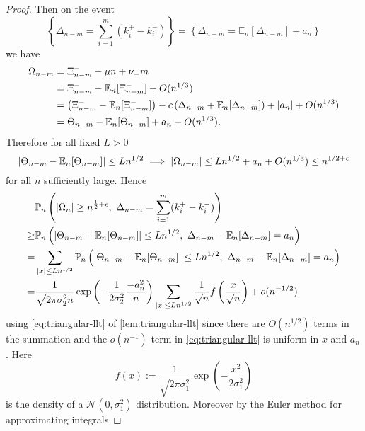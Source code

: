 \documentclass[draft]{scrartcl}
\newcommand{\E}{\mathbb E}
\newcommand{\calN}{\mathcal N}
\newcommand{\littleo}{o}
\newcommand{\bigo}{O}
\newcommand{\defeq}{:=}
\DeclarePairedDelimiter{\abs}{\lvert}{\rvert}
\begin{document}
\begin{proof}
    Then on the event 
    \begin{equation}
        \left\{ \Delta_{n-m} = \sum_{i=1}^m (k_i^+ - k_i^-) \right\} =
        \left\{ \Delta_{n-m} = \E_n[\Delta_{n-m}] + a_n \right\}
    \end{equation}
    we have
    \begin{align}
        \Omega_{n-m} &= \Xi^-_{n-m} - \mu n + \nu_- m \\
        &= \Xi^-_{n-m} - \E_n[\Xi^-_{n-m}] + \bigo(n^{1/3}) \\
        &= \left( \Xi^-_{n-m} - \E_n[\Xi^-_{n-m}] \right) - c \left( \Delta_{n-m} + \E_n[\Delta_{n-m}] \right) + \abs{a_n} + \bigo(n^{1/3}) \\
        &= \Theta_{n-m} - \E_n[\Theta_{n-m}] + a_n + \bigo(n^{1/3}).
    \end{align}
    Therefore for all fixed $L > 0$
    \begin{equation}
        \abs{\Theta_{n-m} - \E_n[\Theta_{n-m}]} \leq L n^{1/2} \implies \abs{\Omega_{n-m}} \leq Ln^{1/2} + a_n + \bigo(n^{1/3}) \leq n^{1/2 + \epsilon}
    \end{equation}
    for all $n$ sufficiently large. Hence
    \begin{align}
        &\mathbb P_n \left( \abs{\Omega_n} \geq n^{\frac{1}{2} + \epsilon},\ \Delta_{n-m} = \sum_{i=1}^m (k_i^+ - k_i^-) \right) \nonumber \\
        \geq& \mathbb P_n \left( \abs{\Theta_{n-m} - \E_n[\Theta_{n-m}]} \leq Ln^{1/2},\ \Delta_{n-m} - \E_n[\Delta_{n-m}] = a_n \right) \\
        =& \sum_{\abs{x} \leq Ln^{1/2}} \mathbb P_n \left( \abs{\Theta_{n-m} - \E_n[\Theta_{n-m}]} \leq Ln^{1/2},\ \Delta_{n-m} - \E_n[\Delta_{n-m}] = a_n \right) \\
        =& \frac{1}{\sqrt{2 \pi \sigma_2^2 n}} \exp \left( - \frac{1}{2 \sigma_2^2} \frac{-a_n^2}{n} \right) \sum_{\abs{x} \leq Ln^{1/2}} \frac{1}{\sqrt{n}} f\left( \frac{x}{\sqrt{n}} \right) + \littleo(n^{-1/2})
    \end{align}
    using \cref{eq:triangular-llt} of \cref{lem:triangular-llt} since there are $\bigo(n^{1/2})$ terms in the summation and the $\littleo(n^{-1})$ term in \cref{eq:triangular-llt} is uniform in $x$ and $a_n$. Here
    \begin{equation}
        f(x) \defeq \frac{1}{\sqrt{2 \pi \sigma_1^2}} \exp\left( -\frac{x^2}{2 \sigma_1^2} \right)
    \end{equation}
    is the density of a $\calN(0, \sigma_1^2)$ distribution. Moreover by the Euler method for approximating integrals

\end{proof}
\end{document}
